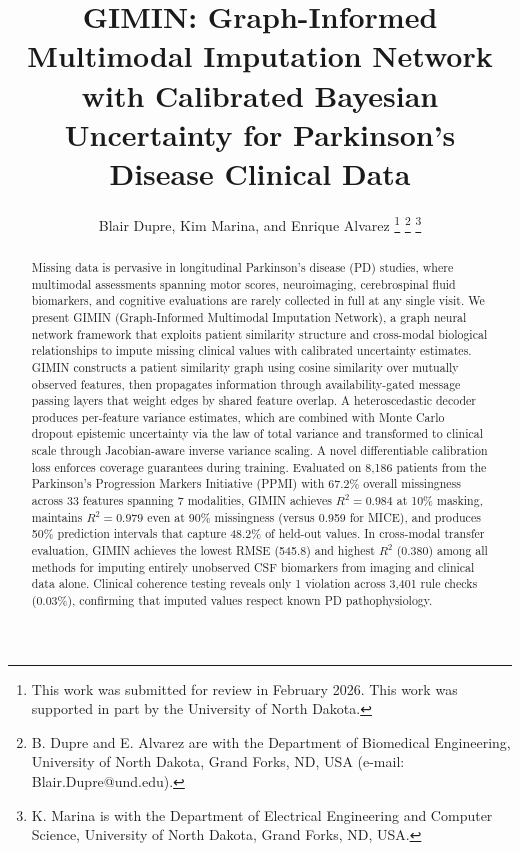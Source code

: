 \documentclass[journal,twoside,web]{ieeecolor}
\begin{document}
\title{GIMIN: Graph-Informed Multimodal Imputation Network with Calibrated Bayesian Uncertainty for Parkinson's Disease Clinical Data}

\author{Blair Dupre, Kim Marina, and Enrique Alvarez
\thanks{This work was submitted for review in February 2026. This work was supported in part by the University of North Dakota.}
\thanks{B. Dupre and E. Alvarez are with the Department of Biomedical Engineering, University of North Dakota, Grand Forks, ND, USA (e-mail: Blair.Dupre@und.edu).}
\thanks{K. Marina is with the Department of Electrical Engineering and Computer Science, University of North Dakota, Grand Forks, ND, USA.}
}

\maketitle

\begin{abstract}
Missing data is pervasive in longitudinal Parkinson's disease (PD) studies, where multimodal assessments spanning motor scores, neuroimaging, cerebrospinal fluid biomarkers, and cognitive evaluations are rarely collected in full at any single visit. We present GIMIN (Graph-Informed Multimodal Imputation Network), a graph neural network framework that exploits patient similarity structure and cross-modal biological relationships to impute missing clinical values with calibrated uncertainty estimates. GIMIN constructs a patient similarity graph using cosine similarity over mutually observed features, then propagates information through availability-gated message passing layers that weight edges by shared feature overlap. A heteroscedastic decoder produces per-feature variance estimates, which are combined with Monte Carlo dropout epistemic uncertainty via the law of total variance and transformed to clinical scale through Jacobian-aware inverse variance scaling. A novel differentiable calibration loss enforces coverage guarantees during training. Evaluated on 8{,}186 patients from the Parkinson's Progression Markers Initiative (PPMI) with 67.2\% overall missingness across 33 features spanning 7 modalities, GIMIN achieves $R^2 = 0.984$ at 10\% masking, maintains $R^2 = 0.979$ even at 90\% missingness (versus 0.959 for MICE), and produces 50\% prediction intervals that capture 48.2\% of held-out values. In cross-modal transfer evaluation, GIMIN achieves the lowest RMSE (545.8) and highest $R^2$ (0.380) among all methods for imputing entirely unobserved CSF biomarkers from imaging and clinical data alone. Clinical coherence testing reveals only 1 violation across 3{,}401 rule checks (0.03\%), confirming that imputed values respect known PD pathophysiology.
\end{abstract}
\end{document}
